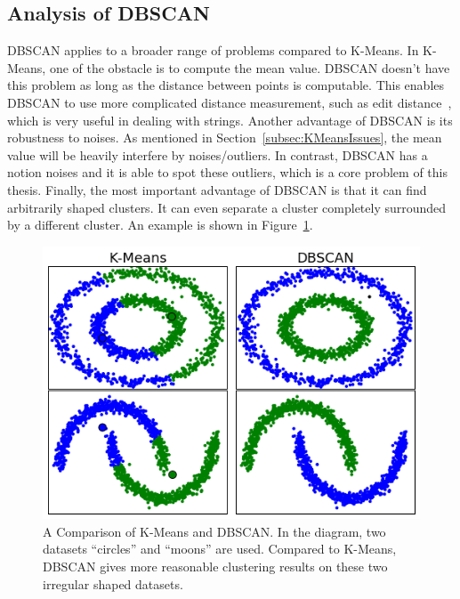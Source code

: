 \subsection{Analysis of DBSCAN}
\label{subsec:DBSCANalgorithm}
DBSCAN applies to a broader range of problems compared to K-Means. In K-Means, one of the obstacle is to compute the mean value. DBSCAN doesn't have this problem as long as the distance between points is computable. This enables DBSCAN to use more complicated distance measurement, such as edit distance~\cite{cormen2009introduction}, which is very useful in dealing with strings. Another advantage of DBSCAN is its robustness to noises. As mentioned in Section~\ref{subsec:KMeansIssues}, the mean value will be heavily interfere by noises/outliers. In contrast, DBSCAN has a notion noises and it is able to spot these outliers, which is a core problem of this thesis. Finally, the most important advantage of DBSCAN is that it can find arbitrarily shaped clusters. It can even separate a cluster completely surrounded by a different cluster. An example is shown in Figure~\ref{fig:KMeansDBSCAN}.

\begin{figure}
	\begin{center}
		\includegraphics[width=\textwidth]{images/KMeansDBSCAN.png}
		\caption{A Comparison of K-Means and DBSCAN. In the diagram, two datasets ``circles'' and ``moons'' are used. Compared to K-Means, DBSCAN gives more reasonable clustering results on these two irregular shaped datasets.}
		\label{fig:KMeansDBSCAN}
	\end{center}
\end{figure}

